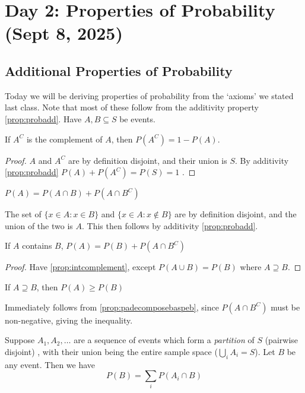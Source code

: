\section{Day 2: Properties of Probability (Sept 8, 2025)}

\subsection{Additional Properties of Probability}
Today we will be deriving properties of probability from the `axioms' we stated last class. Note that most of these follow from the additivity property \ref{prop:probadd}. Have $A, B \subseteq S$ be events.
\begin{simplethm}
    If $A^C$ is the complement of $A$, then $P(A^C) = 1 - P(A)$. \label{prop:pcomplement}
\end{simplethm}
\begin{proof}
    $A$ and $A^C$ are by definition disjoint, and their union is $S$. By additivity \ref{prop:probadd} $P(A) + P(A^C) = P(S) = 1$ .
\end{proof}
\begin{simplethm}
    $P(A) = P(A \cap B) + P(A \cap B^C)$ \label{prop:intcomplement} 
\end{simplethm}
The set of $\{ x \in A : x \in B \}$ and $\{ x \in A : x \not \in B \}$ are by definition disjoint, and the union of the two is $A$. This then follows by additivity \ref{prop:probadd}.
\begin{simplethm}
    If $A$ contains $B$, $P(A) = P(B) + P(A \cap B^C)$ \label{prop:padecomposebaspeb}
\end{simplethm}
\begin{proof}
    Have \ref{prop:intcomplement}, except $P(A \cup B) = P(B)$ where $A \supseteq B$.
\end{proof}
\begin{simplethm}[Monotonicity]
    If $A \supseteq B$, then $P(A) \geq P(B)$
\end{simplethm}
Immediately follows from \ref{prop:padecomposebaspeb}, since $P(A \cap B^C)$ must be non-negative, giving the inequality. 

\begin{theorem}
    Suppose $A_1, A_2, \dots$ are a sequence of events which form a \textit{partition} of $S$ (pairwise disjoint) , with their union being the entire sample space ($\bigcup_i A_i = S$). Let $B$ be any event. Then we have
    \[
    P(B) = \sum_i P(A_i \cap B)
    \]
\end{theorem}

